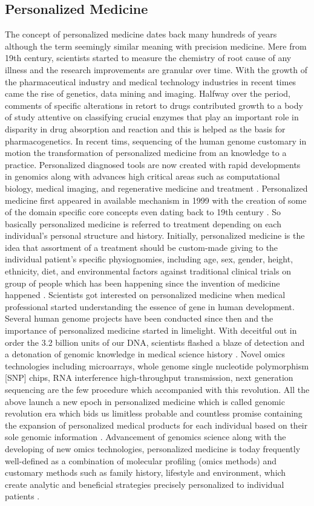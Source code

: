 \documentclass[sigconf]{acmart}
\begin{document}
\subsection{Personalized Medicine} The concept of personalized medicine dates back many hundreds of years although the term seemingly similar meaning with precision medicine. Mere from 19th century, scientists started to measure the chemistry of root cause of any illness and the research improvements are granular over time. With the growth of the pharmaceutical industry and medical technology industries in recent times came the rise of genetics, data mining and imaging. Halfway over the period, comments of specific alterations in retort to drugs contributed growth to a body of study attentive on classifying crucial enzymes that play an important role in disparity in drug absorption and reaction and this is helped as the basis for pharmacogenetics. In recent tims, sequencing of the human genome customary in motion the transformation of personalized medicine from an knowledge to a practice. Personalized diagnosed tools are now created with rapid developments in genomics along with advances high critical areas such as computational biology, medical imaging, and regenerative medicine and treatment \cite{editor03}. Personalized medicine first appeared in available mechanism in 1999 with the creation of some of the domain specific core concepts even dating back to 19th century \cite{editor05}.  So basically personalized medicine is referred to treatment depending on each individual’s personal structure and history. Initially, personalized medicine is the idea that assortment of a treatment should be custom-made giving to the individual patient’s specific physiognomies, including age, sex, gender, height, ethnicity, diet, and environmental factors against traditional clinical trials on group of people which has been happening since the invention of medicine happened \cite{editor03}. Scientists got interested on personalized medicine when medical professional started understanding the essence of gene in human development. Several human genome projects have been conducted since then and the importance of personalized medicine started in limelight. With deceitful out in order the 3.2 billion units of our DNA, scientists flashed a blaze of detection and a detonation of genomic knowledge in medical science history \cite{editor05}. Novel omics technologies including microarrays, whole genome single nucleotide polymorphism [SNP] chips, RNA interference high-throughput transmission, next generation sequencing are the few procedure which accompanied with this revolution. All the above launch a new epoch in personalized medicine which is called genomic revolution era which bids us limitless probable and countless promise containing the expansion of personalized medical products for each individual based on their sole genomic information \cite{editor04}. Advancement of genomics science along with the developing of new omics technologies, personalized medicine is today frequently well-defined as a combination of molecular profiling (omics methods) and customary methods such as family history, lifestyle and environment, which create analytic and beneficial strategies precisely personalized to individual patients \cite{editor05,editor03}.
\end{document}
